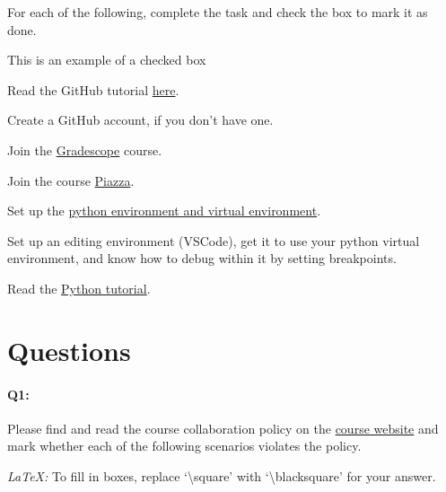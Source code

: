 \documentclass[11pt]{article}
\newcommand{\cmark}{\ding{51}}%
\newcommand{\done}{\rlap{$\square$}{\raisebox{2pt}{\large\hspace{1pt}\cmark}}%
\hspace{-2.5pt}}
\begin{document}
For each of the following, complete the task and check the box to mark it as done.
\begin{todolist}
    \item[\done] This is an example of a checked box
    \item Read the GitHub tutorial \href{https://browncsci1430.github.io/webpage/resources/github_guide/}{here}.
    \item Create a GitHub account, if you don't have one.
    \item Join the \href{https://www.gradescope.com/}{Gradescope} course.
    \item Join the course \href{https://piazza.com/}{Piazza}.
    \item Set up the \href{https://browncsci1430.github.io/webpage/resources/python_setup/}{python environment and virtual environment}.
    \item Set up an editing environment (VSCode), get it to use your python virtual environment, and know how to debug within it by setting breakpoints.
    \item Read the \href{https://browncsci1430.github.io/webpage/resources/python_tutorial/}{Python tutorial}.
\end{todolist}

\section*{Questions}

\paragraph{Q1:} Please find and read the course collaboration policy on the \href{http://cs.brown.edu/courses/csci1430/}{course website} and mark whether each of the following scenarios violates the policy.

\emph{LaTeX:} To fill in boxes, replace `\textbackslash square' with `\textbackslash blacksquare' for your answer.
\end{document}
